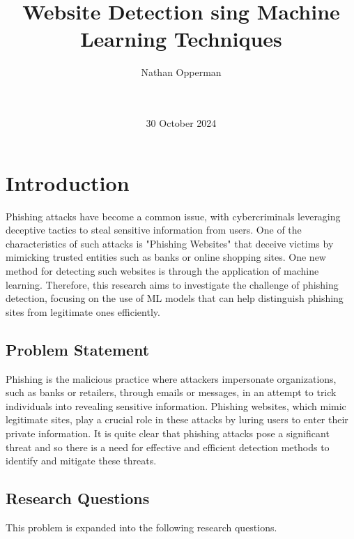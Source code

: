 \documentclass{sigkddExp}
\begin{document}
\title{Website Detection sing Machine Learning Techniques}


\author{
%
\alignauthor Nathan Opperman \\
       \\
       \\
}

\date{30 October 2024}
\maketitle

\section{Introduction}
Phishing attacks have become a common issue, with cybercriminals leveraging deceptive tactics to steal sensitive information from users. One of the characteristics of such attacks is "Phishing Websites" that deceive victims by mimicking trusted entities such as banks or online shopping sites. One new method for detecting such websites is through the application of machine learning. Therefore, this research aims to investigate the challenge of phishing detection, focusing on the use of ML models that can help distinguish phishing sites from legitimate ones efficiently.
\subsection{Problem Statement}
\label{prob_statement}
Phishing is the malicious practice where attackers impersonate organizations, such as banks or retailers, through emails or messages, in an attempt to trick individuals into revealing sensitive information. Phishing websites, which mimic legitimate sites, play a crucial role in these attacks by luring users to enter their private information. It is quite clear that phishing attacks pose a significant threat and so there is a need for effective and efficient detection methods to identify and mitigate these threats.
\subsection{Research Questions}
This problem is expanded into the following research questions.
\end{document}
